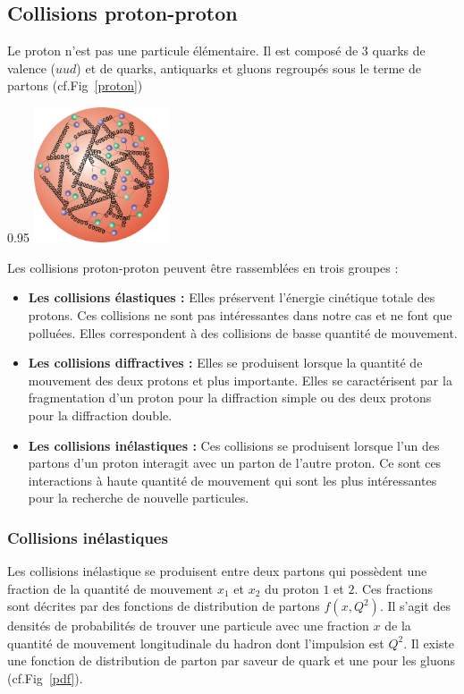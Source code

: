 \subsection{Collisions proton-proton}
Le proton n'est pas une particule élémentaire. Il est composé de \num{3} quarks de valence ($uud$) et de quarks, antiquarks et gluons regroupés sous le terme de partons (cf.Fig~\ref{proton})

\begin{minipagewithmarginpars}[ht!]{0.95\textwidth}
\centering
\includegraphics[width=0.3\textwidth]{SM/quarks3.png}
\label{proton}	
\end{minipagewithmarginpars}

Les collisions proton-proton peuvent être rassemblées en trois groupes :
\begin{itemize}[label=$\bullet$]
	\item \textbf{Les collisions élastiques : } Elles préservent l'énergie cinétique totale des protons. Ces collisions ne sont pas intéressantes dans notre cas et ne font que polluées. Elles correspondent à des collisions de basse quantité de mouvement.
	\item\textbf{Les collisions diffractives : } Elles se produisent lorsque la quantité de mouvement des deux protons et plus importante. Elles se caractérisent par la fragmentation d'un proton pour la diffraction simple ou des deux protons pour la diffraction double.
	\item \textbf{Les collisions inélastiques : } Ces collisions se produisent lorsque l'un des partons d'un proton interagit avec un parton de l'autre proton. Ce sont ces interactions à haute quantité de mouvement qui sont les plus intéressantes pour la recherche de nouvelle particules.
\end{itemize}

\subsubsection{Collisions inélastiques}
Les collisions inélastique se produisent entre deux partons qui possèdent une fraction de la quantité de mouvement $x_{1}$ et $x_{2}$ du proton $1$ et $2$. Ces fractions sont décrites par des fonctions de distribution de partons $f(x,Q^{2})$. Il s'agit des densités de probabilités de trouver une particule avec une fraction $x$ de la quantité de mouvement longitudinale du hadron dont l'impulsion est $Q^{2}$. Il existe une fonction de distribution de parton par saveur de quark et une pour les gluons (cf.Fig~\ref{pdf}).

